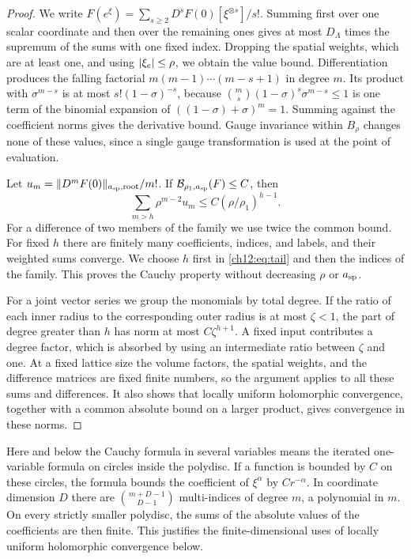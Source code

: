 \begin{proof}
We write $F(e^\xi)=\sum_{s\ge2}D^sF(0)[\xi^{\otimes s}]/s!$. Summing first over one scalar coordinate and then over the remaining ones gives at most $D_\Lambda$ times the supremum of the sums with one fixed index. Dropping the spatial weights, which are at least one, and using $\lvert \xi_e\rvert\le\rho$, we obtain the value bound. Differentiation produces the falling factorial $m(m-1)\cdots(m-s+1)$ in degree $m$. Its product with $\sigma^{m-s}$ is at most $s!(1-\sigma)^{-s}$, because $\binom ms(1-\sigma)^s\sigma^{m-s}\le1$ is one term of the binomial expansion of $((1-\sigma)+\sigma)^m=1$. Summing against the coefficient norms gives the derivative bound. Gauge invariance within $B_\rho$ changes none of these values, since a single gauge transformation is used at the point of evaluation.

Let $u_m=\lVert D^mF(0)\rVert_{a_{\mathrm{sp}},\mathrm{root}}/m!$. If $\mathcal B_{\rho_1,a_{\mathrm{sp}}}(F)\le C$, then
\begin{equation}
 \sum_{m>h}\rho^{m-2}u_m\le C(\rho/\rho_1)^{h-1}. \label{ch12:eq:tail}
\end{equation}
For a difference of two members of the family we use twice the common bound. For fixed $h$ there are finitely many coefficients, indices, and labels, and their weighted sums converge. We choose $h$ first in \eqref{ch12:eq:tail} and then the indices of the family. This proves the Cauchy property without decreasing $\rho$ or $a_{\mathrm{sp}}$.

For a joint vector series we group the monomials by total degree. If the ratio of each inner radius to the corresponding outer radius is at most $\zeta<1$, the part of degree greater than $h$ has norm at most $C\zeta^{h+1}$. A fixed input contributes a degree factor, which is absorbed by using an intermediate ratio between $\zeta$ and one. At a fixed lattice size the volume factors, the spatial weights, and the difference matrices are fixed finite numbers, so the argument applies to all these sums and differences. It also shows that locally uniform holomorphic convergence, together with a common absolute bound on a larger product, gives convergence in these norms.
\end{proof}

Here and below the Cauchy formula in several variables means the iterated one-variable formula on circles inside the polydisc. If a function is bounded by $C$ on these circles, the formula bounds the coefficient of $\xi^\alpha$ by $Cr^{-\alpha}$. In coordinate dimension $D$ there are $\binom{m+D-1}{D-1}$ multi-indices of degree $m$, a polynomial in $m$. On every strictly smaller polydisc, the sums of the absolute values of the coefficients are then finite. This justifies the finite-dimensional uses of locally uniform holomorphic convergence below.

